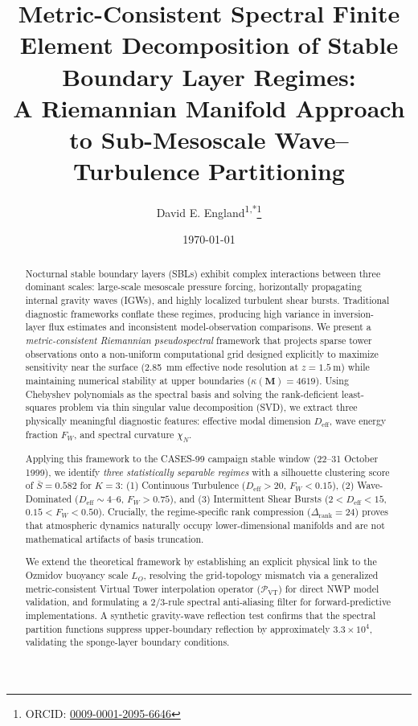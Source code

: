 \documentclass[11pt,a4paper]{article}
\title{Metric-Consistent Spectral Finite Element Decomposition of Stable Boundary Layer Regimes: \\
A Riemannian Manifold Approach to Sub-Mesoscale Wave--Turbulence Partitioning}
\author{David E. England\textsuperscript{1,*}\thanks{ORCID: \href{https://orcid.org/0009-0001-2095-6646}{0009-0001-2095-6646}}}
\affil{\textsuperscript{1}The University of Alabama in Huntsville, 301 Sparkman Drive, Huntsville, AL 35899, USA}
\affil{\textsuperscript{*}Corresponding author: David.England@UAH.Edu}
\date{\today}
\begin{document}
\maketitle

\begin{abstract}
Nocturnal stable boundary layers (SBLs) exhibit complex interactions between three dominant scales: large-scale mesoscale pressure forcing, horizontally propagating internal gravity waves (IGWs), and highly localized turbulent shear bursts. Traditional diagnostic frameworks conflate these regimes, producing high variance in inversion-layer flux estimates and inconsistent model-observation comparisons. We present a \emph{metric-consistent Riemannian pseudospectral} framework that projects sparse tower observations onto a non-uniform computational grid designed explicitly to maximize sensitivity near the surface (\SI{2.85}{\milli\meter} effective node resolution at $z = \SI{1.5}{\meter}$) while maintaining numerical stability at upper boundaries ($\kappa(\mathbf{M}) = 4619$). Using Chebyshev polynomials as the spectral basis and solving the rank-deficient least-squares problem via thin singular value decomposition (SVD), we extract three physically meaningful diagnostic features: effective modal dimension $D_{\mathrm{eff}}$, wave energy fraction $F_W$, and spectral curvature $\chi_N$.

Applying this framework to the CASES-99 campaign stable window (22--31 October 1999), we identify \emph{three statistically separable regimes} with a silhouette clustering score of $\bar{S} = 0.582$ for $K=3$: (1) Continuous Turbulence ($D_{\mathrm{eff}} > 20$, $F_W < 0.15$), (2) Wave-Dominated ($D_{\mathrm{eff}} \sim 4$--$6$, $F_W > 0.75$), and (3) Intermittent Shear Bursts ($2 < D_{\mathrm{eff}} < 15$, $0.15 < F_W < 0.50$). Crucially, the regime-specific rank compression ($\Delta_{\mathrm{rank}} = 24$) proves that atmospheric dynamics naturally occupy lower-dimensional manifolds and are not mathematical artifacts of basis truncation. 

We extend the theoretical framework by establishing an explicit physical link to the Ozmidov buoyancy scale $L_O$, resolving the grid-topology mismatch via a generalized metric-consistent Virtual Tower interpolation operator ($\mathcal{P}_{\mathrm{VT}}$) for direct NWP model validation, and formulating a $2/3$-rule spectral anti-aliasing filter for forward-predictive implementations. A synthetic gravity-wave reflection test confirms that the spectral partition functions suppress upper-boundary reflection by approximately $3.3\times 10^4$, validating the sponge-layer boundary conditions.
\end{abstract}
\end{document}
